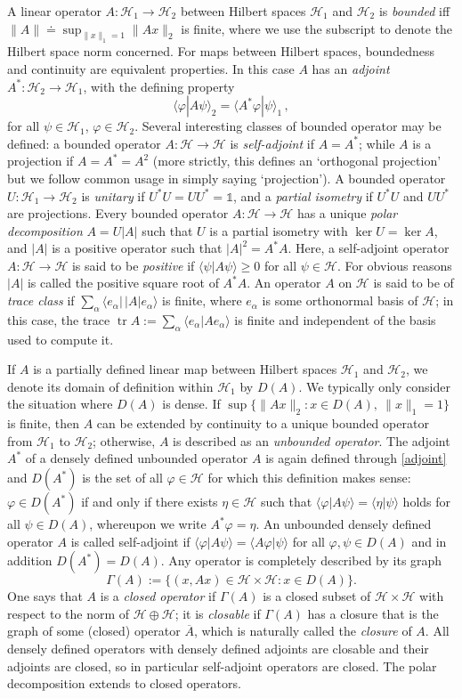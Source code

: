 \documentclass[12pt]{article}
\newcommand{\1}{\mathds{1}}                         %
\newcommand{\Hcal}{\mathcal {H}}
\newcommand{\HH}{{\mathcal{H}}}
\newcommand{\II}{{\mathbb{1}}}
\newcommand{\ph}{\varphi}
\newcommand{\ip}[2]{\langle #1|#2\rangle}
\newcommand{\be}{\begin{equation}}
\newcommand{\ee}{\end{equation}}
\DeclareMathOperator{\tr}{tr}
\begin{document}
A linear operator $A:\HH_1\to\HH_2$ between Hilbert spaces $\HH_1$ and $\HH_2$ is \emph{bounded} iff $\|A\|\doteq \sup_{\|x\|_1=1} \|Ax\|_2$ is finite, where we use the subscript to denote the Hilbert space norm concerned. For maps between Hilbert spaces, boundedness and continuity are equivalent properties. In this case $A$ has an \emph{adjoint} $A^*:\HH_2\to\HH_1$, with the defining property 
\be\label{adjoint}
\ip{\ph}{A\psi}_2=\ip{A^*\ph}{\psi}_1\,,
\ee
for all $\psi\in\HH_1$, $\ph\in\HH_2$. Several interesting classes of bounded operator may be defined: a bounded operator $A:\HH\to\HH$ is \emph{self-adjoint} if $A=A^*$; while $A$ is a projection if $A=A^*=A^2$ (more strictly, this defines an `orthogonal projection' but we follow common usage in simply saying `projection'). A bounded operator $U:\HH_1\to\HH_2$ is \emph{unitary} if $U^*U = UU^* = \II$, and a \emph{partial isometry} if $U^*U$ and $UU^*$ are projections.  Every bounded operator $A:\HH\to\HH$ has a unique \emph{polar decomposition} $A = U|A|$ such that $U$ is a partial isometry with $\ker U=\ker A$, and $|A|$ is a positive operator such that $|A|^2 = A^*A$. Here, a self-adjoint operator $A:\HH\to\HH$ is said to be \emph{positive} if $\ip{\psi}{A\psi}\ge 0$ for all $\psi\in\HH$. For obvious reasons $|A|$ is called the positive square root of $A^*A$. An operator $A$ on $\HH$ is said to be of \emph{trace class} if
$\sum_{\alpha} \ip{e_\alpha}{\,|A|e_\alpha}$ is finite, where $e_\alpha$ is some
orthonormal basis of $\HH$; in this case, the trace $\tr A := \sum_{\alpha} \ip{e_\alpha}{A e_\alpha}$ is finite and independent of the basis used to compute it. 

If $A$ is a partially defined linear map between Hilbert spaces $\HH_1$ and $\HH_2$, 
we denote its domain of definition within $\HH_1$ by $D(A)$. We typically only consider the situation where $D(A)$ is dense. If $\sup\{\|Ax\|_2:x\in D(A),~\|x\|_1=1\}$ is finite, then $A$ can be extended by continuity to a unique bounded operator from $\HH_1$ to $\HH_2$; otherwise, $A$ is described as an \emph{unbounded operator}. The adjoint $A^*$ of a densely defined unbounded operator $A$ is again defined through \eqref{adjoint} and $D(A^*)$ is the set of all $\ph\in\Hcal$ for which this definition makes sense: $\varphi\in D(A^*)$ if and only if there exists $\eta\in\Hcal$ such that $\ip{\ph}{A\psi}=\ip{\eta}{\psi}$ holds for all $\psi\in D(A)$, whereupon we write $A^*\varphi=\eta$. An unbounded densely defined operator $A$ is called self-adjoint if $\ip{\ph}{A\psi}=\ip{A\ph}{\psi}$ for all $\ph,\psi\in D(A)$ and in addition $D(A^*)= D(A)$.
Any operator is completely described by its graph 
\[
\Gamma(A):=\{(x,Ax)\in \HH\times\HH: x\in D(A)\}.
\]
One says that $A$ is a \emph{closed operator} if $\Gamma(A)$ is a closed subset of $\HH\times\HH$ with respect to the norm of $\HH\oplus\HH$; it is \emph{closable} if $\Gamma(A)$ has a closure that is the graph of some (closed) operator $\overline{A}$, which is naturally called the \emph{closure} of $A$. All densely defined operators with densely defined adjoints are closable and their adjoints are closed, so in particular self-adjoint operators are closed. The polar decomposition extends to closed operators. 
 
\end{document}
